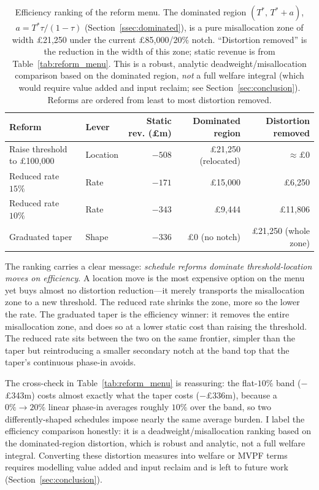 \begin{table}[htbp]
\centering
\caption{Efficiency ranking of the reform menu. The dominated region
$(T^{*},\,T^{*}+a)$, $a=T^{*}\tau/(1-\tau)$ (Section~\ref{ssec:dominated}), is a
pure misallocation zone of width \pounds21{,}250 under the current
\pounds85{,}000/$20\%$ notch. ``Distortion removed'' is the reduction in the width
of this zone; static revenue is from Table~\ref{tab:reform_menu}. This is a
robust, analytic deadweight/misallocation comparison based on the dominated
region, \emph{not} a full welfare integral (which would require value added and
input reclaim; see Section~\ref{sec:conclusion}). Reforms are ordered from least
to most distortion removed.}
\label{tab:efficiency}
\begin{tabular}{llrrr}
\toprule
Reform & Lever & Static rev. (\pounds m) & Dominated region & Distortion removed \\
\midrule
Raise threshold to \pounds100{,}000 & Location & $-508$ & \pounds21{,}250 (relocated) & $\approx\pounds0$ \\
Reduced rate $15\%$ & Rate & $-171$ & \pounds15{,}000 & \pounds6{,}250 \\
Reduced rate $10\%$ & Rate & $-343$ & \pounds9{,}444 & \pounds11{,}806 \\
Graduated taper & Shape & $-336$ & \pounds0 (no notch) & \pounds21{,}250 (whole zone) \\
\bottomrule
\end{tabular}
\end{table}

The ranking carries a clear message: \emph{schedule reforms dominate
threshold-location moves on efficiency}. A location move is the most expensive
option on the menu yet buys almost no distortion reduction---it merely transports
the misallocation zone to a new threshold. The reduced rate shrinks the zone, more
so the lower the rate. The graduated taper is the efficiency winner: it removes the
entire misallocation zone, and does so at a lower static cost than raising the
threshold. The reduced rate sits between the two on the same frontier, simpler than
the taper but reintroducing a smaller secondary notch at the band top that the
taper's continuous phase-in avoids.

The cross-check in Table~\ref{tab:reform_menu} is reassuring: the flat-$10\%$ band
(\(-\)\pounds343m) costs almost exactly what the taper costs
(\(-\)\pounds336m), because a $0\%\to20\%$ linear phase-in averages roughly $10\%$
over the band, so two differently-shaped schedules impose nearly the same average
burden. I label the efficiency comparison honestly: it is a
deadweight/misallocation ranking based on the dominated-region distortion, which is
robust and analytic, not a full welfare integral. Converting these distortion
measures into welfare or MVPF terms requires modelling value added and input
reclaim and is left to future work (Section~\ref{sec:conclusion}).
